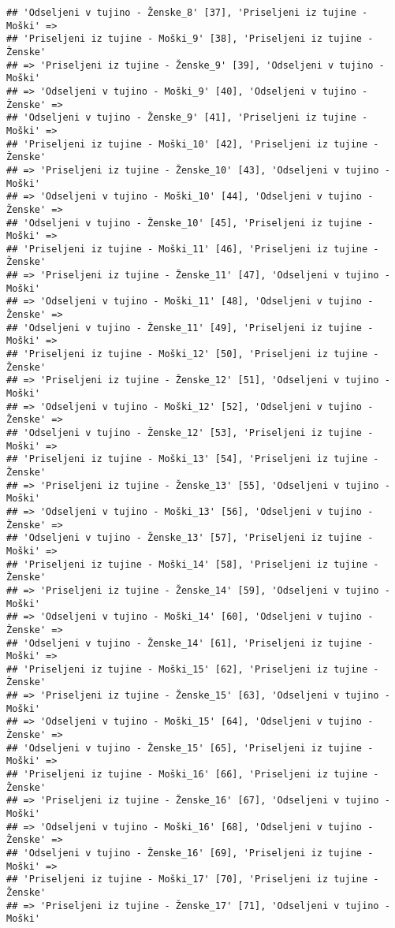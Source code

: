 \documentclass[]{article}
\begin{document}
\begin{verbatim}
## 'Odseljeni v tujino - Ženske_8' [37], 'Priseljeni iz tujine - Moški' =>
## 'Priseljeni iz tujine - Moški_9' [38], 'Priseljeni iz tujine - Ženske'
## => 'Priseljeni iz tujine - Ženske_9' [39], 'Odseljeni v tujino - Moški'
## => 'Odseljeni v tujino - Moški_9' [40], 'Odseljeni v tujino - Ženske' =>
## 'Odseljeni v tujino - Ženske_9' [41], 'Priseljeni iz tujine - Moški' =>
## 'Priseljeni iz tujine - Moški_10' [42], 'Priseljeni iz tujine - Ženske'
## => 'Priseljeni iz tujine - Ženske_10' [43], 'Odseljeni v tujino - Moški'
## => 'Odseljeni v tujino - Moški_10' [44], 'Odseljeni v tujino - Ženske' =>
## 'Odseljeni v tujino - Ženske_10' [45], 'Priseljeni iz tujine - Moški' =>
## 'Priseljeni iz tujine - Moški_11' [46], 'Priseljeni iz tujine - Ženske'
## => 'Priseljeni iz tujine - Ženske_11' [47], 'Odseljeni v tujino - Moški'
## => 'Odseljeni v tujino - Moški_11' [48], 'Odseljeni v tujino - Ženske' =>
## 'Odseljeni v tujino - Ženske_11' [49], 'Priseljeni iz tujine - Moški' =>
## 'Priseljeni iz tujine - Moški_12' [50], 'Priseljeni iz tujine - Ženske'
## => 'Priseljeni iz tujine - Ženske_12' [51], 'Odseljeni v tujino - Moški'
## => 'Odseljeni v tujino - Moški_12' [52], 'Odseljeni v tujino - Ženske' =>
## 'Odseljeni v tujino - Ženske_12' [53], 'Priseljeni iz tujine - Moški' =>
## 'Priseljeni iz tujine - Moški_13' [54], 'Priseljeni iz tujine - Ženske'
## => 'Priseljeni iz tujine - Ženske_13' [55], 'Odseljeni v tujino - Moški'
## => 'Odseljeni v tujino - Moški_13' [56], 'Odseljeni v tujino - Ženske' =>
## 'Odseljeni v tujino - Ženske_13' [57], 'Priseljeni iz tujine - Moški' =>
## 'Priseljeni iz tujine - Moški_14' [58], 'Priseljeni iz tujine - Ženske'
## => 'Priseljeni iz tujine - Ženske_14' [59], 'Odseljeni v tujino - Moški'
## => 'Odseljeni v tujino - Moški_14' [60], 'Odseljeni v tujino - Ženske' =>
## 'Odseljeni v tujino - Ženske_14' [61], 'Priseljeni iz tujine - Moški' =>
## 'Priseljeni iz tujine - Moški_15' [62], 'Priseljeni iz tujine - Ženske'
## => 'Priseljeni iz tujine - Ženske_15' [63], 'Odseljeni v tujino - Moški'
## => 'Odseljeni v tujino - Moški_15' [64], 'Odseljeni v tujino - Ženske' =>
## 'Odseljeni v tujino - Ženske_15' [65], 'Priseljeni iz tujine - Moški' =>
## 'Priseljeni iz tujine - Moški_16' [66], 'Priseljeni iz tujine - Ženske'
## => 'Priseljeni iz tujine - Ženske_16' [67], 'Odseljeni v tujino - Moški'
## => 'Odseljeni v tujino - Moški_16' [68], 'Odseljeni v tujino - Ženske' =>
## 'Odseljeni v tujino - Ženske_16' [69], 'Priseljeni iz tujine - Moški' =>
## 'Priseljeni iz tujine - Moški_17' [70], 'Priseljeni iz tujine - Ženske'
## => 'Priseljeni iz tujine - Ženske_17' [71], 'Odseljeni v tujino - Moški'

\end{verbatim}
\end{document}
